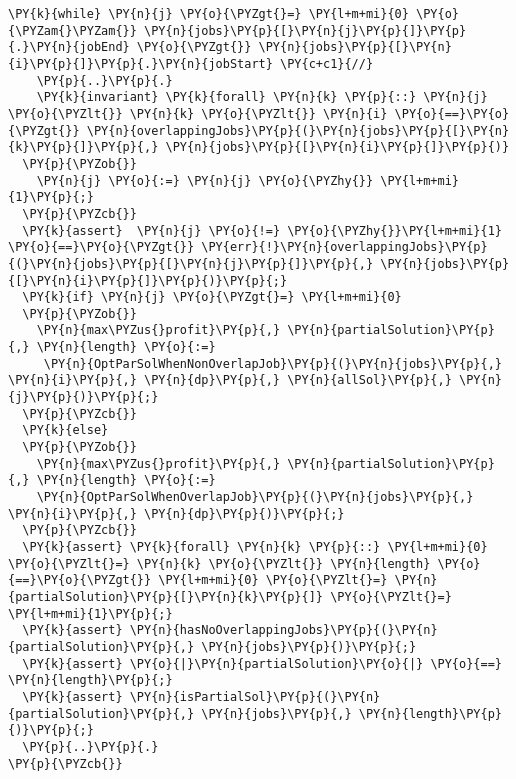 \begin{enumerate}
\begin{Verbatim}[commandchars=\\\{\},fontsize=\footnotesize]
  \PY{k}{while} \PY{n}{j} \PY{o}{\PYZgt{}=} \PY{l+m+mi}{0} \PY{o}{\PYZam{}\PYZam{}} \PY{n}{jobs}\PY{p}{[}\PY{n}{j}\PY{p}{]}\PY{p}{.}\PY{n}{jobEnd} \PY{o}{\PYZgt{}} \PY{n}{jobs}\PY{p}{[}\PY{n}{i}\PY{p}{]}\PY{p}{.}\PY{n}{jobStart} \PY{c+c1}{//}
    \PY{p}{..}\PY{p}{.}
    \PY{k}{invariant} \PY{k}{forall} \PY{n}{k} \PY{p}{::} \PY{n}{j} \PY{o}{\PYZlt{}} \PY{n}{k} \PY{o}{\PYZlt{}} \PY{n}{i} \PY{o}{==}\PY{o}{\PYZgt{}} \PY{n}{overlappingJobs}\PY{p}{(}\PY{n}{jobs}\PY{p}{[}\PY{n}{k}\PY{p}{]}\PY{p}{,} \PY{n}{jobs}\PY{p}{[}\PY{n}{i}\PY{p}{]}\PY{p}{)} 
  \PY{p}{\PYZob{}}
    \PY{n}{j} \PY{o}{:=} \PY{n}{j} \PY{o}{\PYZhy{}} \PY{l+m+mi}{1}\PY{p}{;}
  \PY{p}{\PYZcb{}}
  \PY{k}{assert}  \PY{n}{j} \PY{o}{!=} \PY{o}{\PYZhy{}}\PY{l+m+mi}{1} \PY{o}{==}\PY{o}{\PYZgt{}} \PY{err}{!}\PY{n}{overlappingJobs}\PY{p}{(}\PY{n}{jobs}\PY{p}{[}\PY{n}{j}\PY{p}{]}\PY{p}{,} \PY{n}{jobs}\PY{p}{[}\PY{n}{i}\PY{p}{]}\PY{p}{)}\PY{p}{;}
  \PY{k}{if} \PY{n}{j} \PY{o}{\PYZgt{}=} \PY{l+m+mi}{0}
  \PY{p}{\PYZob{}}
    \PY{n}{max\PYZus{}profit}\PY{p}{,} \PY{n}{partialSolution}\PY{p}{,} \PY{n}{length} \PY{o}{:=}
     \PY{n}{OptParSolWhenNonOverlapJob}\PY{p}{(}\PY{n}{jobs}\PY{p}{,} \PY{n}{i}\PY{p}{,} \PY{n}{dp}\PY{p}{,} \PY{n}{allSol}\PY{p}{,} \PY{n}{j}\PY{p}{)}\PY{p}{;}
  \PY{p}{\PYZcb{}}
  \PY{k}{else} 
  \PY{p}{\PYZob{}}
    \PY{n}{max\PYZus{}profit}\PY{p}{,} \PY{n}{partialSolution}\PY{p}{,} \PY{n}{length} \PY{o}{:=} 
    \PY{n}{OptParSolWhenOverlapJob}\PY{p}{(}\PY{n}{jobs}\PY{p}{,} \PY{n}{i}\PY{p}{,} \PY{n}{dp}\PY{p}{)}\PY{p}{;}
  \PY{p}{\PYZcb{}}
  \PY{k}{assert} \PY{k}{forall} \PY{n}{k} \PY{p}{::} \PY{l+m+mi}{0} \PY{o}{\PYZlt{}=} \PY{n}{k} \PY{o}{\PYZlt{}} \PY{n}{length} \PY{o}{==}\PY{o}{\PYZgt{}} \PY{l+m+mi}{0} \PY{o}{\PYZlt{}=} \PY{n}{partialSolution}\PY{p}{[}\PY{n}{k}\PY{p}{]} \PY{o}{\PYZlt{}=} \PY{l+m+mi}{1}\PY{p}{;} 
  \PY{k}{assert} \PY{n}{hasNoOverlappingJobs}\PY{p}{(}\PY{n}{partialSolution}\PY{p}{,} \PY{n}{jobs}\PY{p}{)}\PY{p}{;}
  \PY{k}{assert} \PY{o}{|}\PY{n}{partialSolution}\PY{o}{|} \PY{o}{==} \PY{n}{length}\PY{p}{;}
  \PY{k}{assert} \PY{n}{isPartialSol}\PY{p}{(}\PY{n}{partialSolution}\PY{p}{,} \PY{n}{jobs}\PY{p}{,} \PY{n}{length}\PY{p}{)}\PY{p}{;}
  \PY{p}{..}\PY{p}{.}
\PY{p}{\PYZcb{}}
\end{Verbatim}



\end{enumerate}
